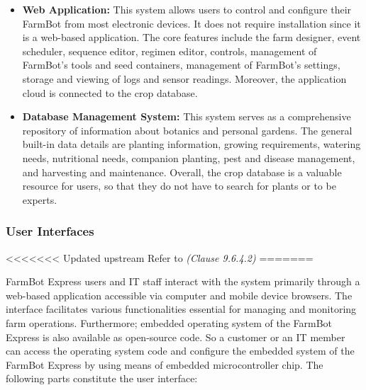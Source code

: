 \begin{itemize}
    \item \textbf{Web Application:} This system allows users to control and configure their FarmBot from most electronic devices. It does not require installation since it is a web-based application. The core features include the farm designer, event scheduler, sequence editor, regimen editor, controls, management of FarmBot's tools and seed containers, management of FarmBot's settings, storage and viewing of logs and sensor readings. Moreover, the application cloud is connected to the crop database.

    \item \textbf{Database Management System:} This system serves as a comprehensive repository of information about botanics and personal gardens. The general built-in data details are planting information, growing requirements, watering needs, nutritional needs, companion planting, pest and disease management, and harvesting and maintenance. Overall, the crop database is a valuable resource for users, so that they do not have to search for plants or to be experts.
    
\end{itemize}

\subsubsection{User Interfaces}
<<<<<<< Updated upstream
Refer to \textit{(Clause 9.6.4.2)}
=======

FarmBot Express users and IT staff interact with the system primarily through a web-based application accessible via computer and mobile device browsers. The interface facilitates various functionalities essential for managing and monitoring farm operations. Furthermore; embedded operating system of the FarmBot Express is also available as open-source code. So a customer or an IT member can access the operating system code and configure the embedded system of the FarmBot Express by using means of embedded microcontroller chip. The following parts constitute the user interface:

